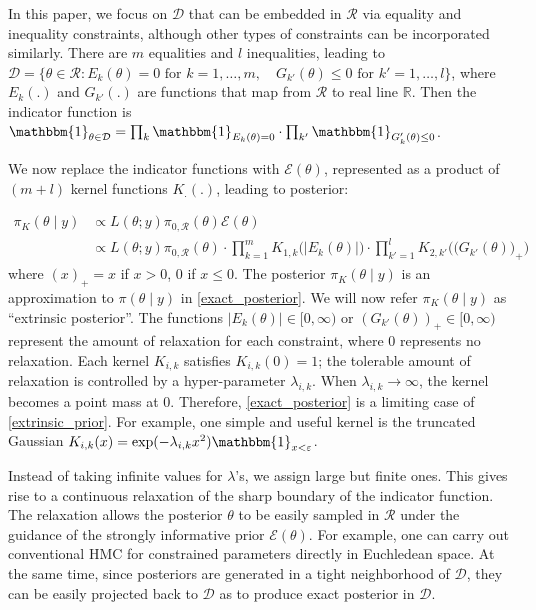 \documentclass[10pt]{article}
\newcommand{\mc}[1]{\mathcal{#1}}
\DeclareMathOperator{\1}{\mathbbm{1}}
\begin{document}
In this paper, we focus on $\mc D$ that can be embedded in $\mc R$ via equality and inequality constraints, although other types of constraints can be incorporated similarly. There are $m$ equalities and $l$ inequalities, leading to $\mc D = \{ \theta \in \mc R: E_k(\theta)=0 \text{ for } k=1,\ldots,m, \quad G_{k'}(\theta)\le 0  \text{ for } k'=1,\ldots,l \}$, where $E_k(.)$ and $G_{k'}(.)$ are functions that map from $\mc R$ to real line $\mathbb R$. Then the indicator function is $\mathbbm{1}_{\theta\in \mc D} = \prod_k \mathbbm{1}_{E_k(\theta)=0} \cdot \prod_{k'}\mathbbm{1}_{G_k'(\theta)\le 0}$.


We now replace the indicator functions with $\mc E(\theta)$, represented as a product of $(m+l)$ kernel functions $K_.(.)$, leading to posterior:

\begin{equation}
\begin{aligned}
\label{extrinsic_prior}
\pi_{K}(\theta \mid y) & \propto L(\theta;y)\pi_{0,\mc R}(\theta) \mc E(\theta) \\
&\propto L(\theta;y)\pi_{0,\mc R}(\theta) \cdot \prod_{k=1}^{m} K_{1,k}\Big( | E_k(\theta)| \Big) \cdot \prod_{k'=1}^{l} K_{2,k'}\Big( \big( G_{k'}(\theta) \big)_+ \Big)
\end{aligned}
\end{equation}
where $(x)_+ = x$ if $x>0$, $0$ if $x\le 0$. The posterior $\pi_{K}(\theta \mid y)$ is an approximation to $\pi(\theta \mid y)$ in \eqref{exact_posterior}. We will now refer $\pi_{K}(\theta \mid y)$ as ``extrinsic posterior''. The functions $|E_k(\theta)|\in [0,\infty)$ or $(G_{k'}(\theta))_+ \in [0,\infty)$ represent the amount of relaxation for each constraint, where $0$ represents no relaxation. Each kernel $K_{i,k}$ satisfies $K_{i,k}(0)=1$; the tolerable amount of relaxation is controlled by a hyper-parameter $\lambda_{i,k}$. When $\lambda_{i,k} \rightarrow \infty$, the kernel becomes a point mass at $0$. Therefore, \eqref{exact_posterior} is a limiting case of \eqref{extrinsic_prior}. For example, one simple and useful kernel is the truncated Gaussian $K_{i,k}(x) = \exp( -{\lambda_{i,k} x^2}) \mathbbm{1}_{x<\varepsilon}$.

Instead of taking infinite values for $\lambda$'s, we assign large but finite ones. This gives rise to a continuous relaxation of the sharp boundary of the indicator function. The relaxation allows the posterior $\theta$ to be easily sampled in $\mc R$ under the guidance of the strongly informative prior $\mc E(\theta)$. For example, one can carry out conventional HMC for constrained parameters directly in Euchledean space. At the same time, since posteriors are generated in a tight neighborhood of $\mc D$, they can be easily projected back to $\mc D$ as to produce exact posterior in $\mc D$.
\end{document}
